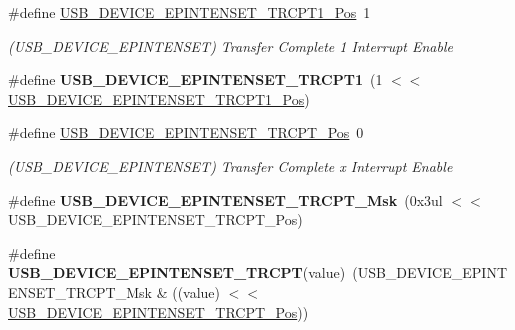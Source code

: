 \begin{DoxyCompactItemize}
\item 
\hypertarget{group___s_a_m_l21___u_s_b_ga394e561158f6937ffa8fadeef7f71b77}{}\#define \hyperlink{group___s_a_m_l21___u_s_b_ga394e561158f6937ffa8fadeef7f71b77}{U\+S\+B\+\_\+\+D\+E\+V\+I\+C\+E\+\_\+\+E\+P\+I\+N\+T\+E\+N\+S\+E\+T\+\_\+\+T\+R\+C\+P\+T1\+\_\+\+Pos}~1\label{group___s_a_m_l21___u_s_b_ga394e561158f6937ffa8fadeef7f71b77}

\begin{DoxyCompactList}\small\item\em (U\+S\+B\+\_\+\+D\+E\+V\+I\+C\+E\+\_\+\+E\+P\+I\+N\+T\+E\+N\+S\+E\+T) Transfer Complete 1 Interrupt Enable \end{DoxyCompactList}\item 
\hypertarget{group___s_a_m_l21___u_s_b_ga06f0bd2a313ecc0d410f8de25d775190}{}\#define {\bfseries U\+S\+B\+\_\+\+D\+E\+V\+I\+C\+E\+\_\+\+E\+P\+I\+N\+T\+E\+N\+S\+E\+T\+\_\+\+T\+R\+C\+P\+T1}~(1 $<$$<$ \hyperlink{group___s_a_m_l21___u_s_b_ga394e561158f6937ffa8fadeef7f71b77}{U\+S\+B\+\_\+\+D\+E\+V\+I\+C\+E\+\_\+\+E\+P\+I\+N\+T\+E\+N\+S\+E\+T\+\_\+\+T\+R\+C\+P\+T1\+\_\+\+Pos})\label{group___s_a_m_l21___u_s_b_ga06f0bd2a313ecc0d410f8de25d775190}

\item 
\hypertarget{group___s_a_m_l21___u_s_b_gadf81817960a79838bf93a7575a69fdc9}{}\#define \hyperlink{group___s_a_m_l21___u_s_b_gadf81817960a79838bf93a7575a69fdc9}{U\+S\+B\+\_\+\+D\+E\+V\+I\+C\+E\+\_\+\+E\+P\+I\+N\+T\+E\+N\+S\+E\+T\+\_\+\+T\+R\+C\+P\+T\+\_\+\+Pos}~0\label{group___s_a_m_l21___u_s_b_gadf81817960a79838bf93a7575a69fdc9}

\begin{DoxyCompactList}\small\item\em (U\+S\+B\+\_\+\+D\+E\+V\+I\+C\+E\+\_\+\+E\+P\+I\+N\+T\+E\+N\+S\+E\+T) Transfer Complete x Interrupt Enable \end{DoxyCompactList}\item 
\hypertarget{group___s_a_m_l21___u_s_b_ga92303f9c3f82c9744c433d40bd030ec8}{}\#define {\bfseries U\+S\+B\+\_\+\+D\+E\+V\+I\+C\+E\+\_\+\+E\+P\+I\+N\+T\+E\+N\+S\+E\+T\+\_\+\+T\+R\+C\+P\+T\+\_\+\+Msk}~(0x3ul $<$$<$ U\+S\+B\+\_\+\+D\+E\+V\+I\+C\+E\+\_\+\+E\+P\+I\+N\+T\+E\+N\+S\+E\+T\+\_\+\+T\+R\+C\+P\+T\+\_\+\+Pos)\label{group___s_a_m_l21___u_s_b_ga92303f9c3f82c9744c433d40bd030ec8}

\item 
\hypertarget{group___s_a_m_l21___u_s_b_gaefdd9c3b9b77dd982c0a028c9c07ea7e}{}\#define {\bfseries U\+S\+B\+\_\+\+D\+E\+V\+I\+C\+E\+\_\+\+E\+P\+I\+N\+T\+E\+N\+S\+E\+T\+\_\+\+T\+R\+C\+P\+T}(value)~(U\+S\+B\+\_\+\+D\+E\+V\+I\+C\+E\+\_\+\+E\+P\+I\+N\+T\+E\+N\+S\+E\+T\+\_\+\+T\+R\+C\+P\+T\+\_\+\+Msk \& ((value) $<$$<$ \hyperlink{group___s_a_m_l21___u_s_b_gadf81817960a79838bf93a7575a69fdc9}{U\+S\+B\+\_\+\+D\+E\+V\+I\+C\+E\+\_\+\+E\+P\+I\+N\+T\+E\+N\+S\+E\+T\+\_\+\+T\+R\+C\+P\+T\+\_\+\+Pos}))\label{group___s_a_m_l21___u_s_b_gaefdd9c3b9b77dd982c0a028c9c07ea7e}


\end{DoxyCompactItemize}
